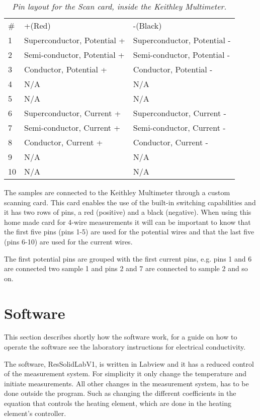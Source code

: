 \documentclass[a4paper,12pt]{article}
\begin{document}
\begin{table}
	\center
	\label{tab:ScanCard}
	\caption{\emph{Pin layout for the Scan card, inside the Keithley Multimeter.}} 
	\begin{tabular}{l|l|l}
		\#  & +(Red) & -(Black) \\
		1  & Superconductor, Potential +	& Superconductor, Potential - \\
		2  & Semi-conductor, Potential +		& Semi-conductor, Potential - \\
		3  & Conductor, Potential +			& Conductor, Potential - \\
		4  & 	N/A	& N/A \\
		5  & 	N/A	& N/A \\
		6  & Superconductor, Current +		& Superconductor, Current - \\
		7  & Semi-conductor, Current +		& Semi-conductor, Current - \\
		8  & Conductor, Current +			& Conductor, Current - \\
		9  & 	N/A	& N/A \\
		10 & 	N/A	& N/A \\
	\end{tabular}
\end{table}

The samples are connected to the Keithley Multimeter through a custom scanning card. This card enables the use of the built-in switching capabilities and it has two rows of pins, a red (positive) and a black (negative). When using this home made card for 4-wire measurements it will can be important to know that the first five pins (pins 1-5) are used for the potential wires and that the  last five (pins 6-10) are used for the current wires.

The first potential pins are grouped with the first current pins, e.g. pins 1 and 6 are connected two sample 1 and pins 2 and 7 are connected to sample 2 and so on.
 

\section{Software}

This section describes shortly how the software work, for a guide on how to operate the software see the laboratory instructions for electrical conductivity. 

The software, ResSolidLabV1, is written in Labview and it   has a reduced control of the measurement system. For simplicity it only change the temperature and initiate measurements. All other changes in the measurement system, has to be done outside the program. Such as changing the different coefficients in the equation that controls the heating element, which are done in the heating element's controller. 
\end{document}

